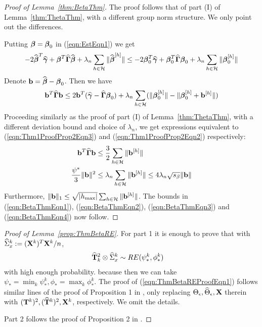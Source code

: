 \begin{proof}[Proof of Lemma~\ref{thm:BetaThm}]
The proof follows that of part (I) of Lemma~\ref{thm:ThetaThm}, with a different group norm structure. We only point out the differences.

Putting ${\boldsymbol{\beta}} = {\boldsymbol{\beta}}_0$ in (\ref{eqn:EstEqn1}) we get
%
$$
-2 \widehat {{\boldsymbol{\beta}}}^T \widehat {{\boldsymbol{\gamma}}} + {\boldsymbol{\beta}}^T \widehat {{\boldsymbol{\Gamma}}} \widehat {{\boldsymbol{\beta}}} + \lambda_n \sum_{h \in {\cal{H}}} \| \widehat {{\boldsymbol{\beta}}}^{[h]}  \| \leq
-2 {\boldsymbol{\beta}}_0^T \widehat {{\boldsymbol{\gamma}}} + {\boldsymbol{\beta}}_0^T \widehat {{\boldsymbol{\Gamma}}} {\boldsymbol{\beta}}_0 + \lambda_n \sum_{h \in {\cal{H}}} \| {\boldsymbol{\beta}}_0^{[h]}  \|
$$
%
Denote ${\bf{b}} = \widehat {{\boldsymbol{\beta}}} - {\boldsymbol{\beta}}_0$. Then we have
%
$$
{\bf{b}}^T \widehat {{\boldsymbol{\Gamma}}} {\bf{b}} \leq 2 {\bf{b}}^T ( \widehat {{\boldsymbol{\gamma}}} - \widehat {{\boldsymbol{\Gamma}}} {\boldsymbol{\beta}}_0 ) + \lambda_n
\sum_{h \in {\cal{H}}} ( \| {\boldsymbol{\beta}}_0^{[h]} \| - \| {\boldsymbol{\beta}}_0^{[h]} + {\bf{b}}^{[h]} \|)
$$
%
Proceeding similarly as the proof of part (I) of Lemma~\ref{thm:ThetaThm}, with a different deviation bound and choice of $\lambda_n$, we get expressions equivalent to (\ref{eqn:Thm1ProofProp2Eqn3}) and (\ref{eqn:Thm1ProofProp2Eqn2}) respectively:
%
\begin{align}
{\bf{b}}^T \widehat {{\boldsymbol{\Gamma}}} {\bf{b}} & \leq \frac{3}{2} \sum_{h \in {\cal{H}}} \| {\bf{b}}^{[h]} \| \\
\frac{\psi^*}{3} \| {\bf{b}} \|^2 & \leq \lambda_n \sum_{h \in {\cal{H}}} \| {\bf{b}}^{[h]} \| \leq 4 \lambda_n \sqrt{s_\beta} \| {\bf{b}} \|
\end{align}
%
Furthermore, $\| {\bf{b}} \|_1 \leq \sqrt{ | h_{\max} |} \sum_{h \in {\cal{H}}} \| {\bf{b}}^{[h]} \| $. The bounds in (\ref{eqn:BetaThmEqn1}), (\ref{eqn:BetaThmEqn2}), (\ref{eqn:BetaThmEqn3}) and (\ref{eqn:BetaThmEqn4}) now
follow.

\end{proof}

\begin{proof}[Proof of Lemma~\ref{prop:ThmBetaRE}]
For part 1 it is enough to prove that with $ \widehat \Sigma_x^k := ({\mathbf{X}}^k)^T {\mathbf{X}}^k/n$,
%
\begin{align}\label{eqn:ThmBetaREProofEqn1}
\widehat {{\mathbf{T}}}_k^2 \otimes \widehat \Sigma_x^k & \sim RE (\psi_*^k, \phi_*^k)
\end{align}
%
with high enough probability. because then we can take $\psi_* = \min_k \psi_*^k, \phi_* = \max_k \phi_*^k$. The proof of (\ref{eqn:ThmBetaREProofEqn1}) follows similar lines of the proof of Proposition 1 in \cite{LinEtal16}, only replacing $\Theta_\epsilon, \widehat \Theta_\epsilon, {\mathbf{X}}$ therein with $({\mathbf{T}}^k)^2, (\widehat {{\mathbf{T}}}^k)^2, {\mathbf{X}}^k$, respectively. We omit the details.

Part 2 follows the proof of Proposition 2 in \cite{LinEtal16}.
\end{proof}

